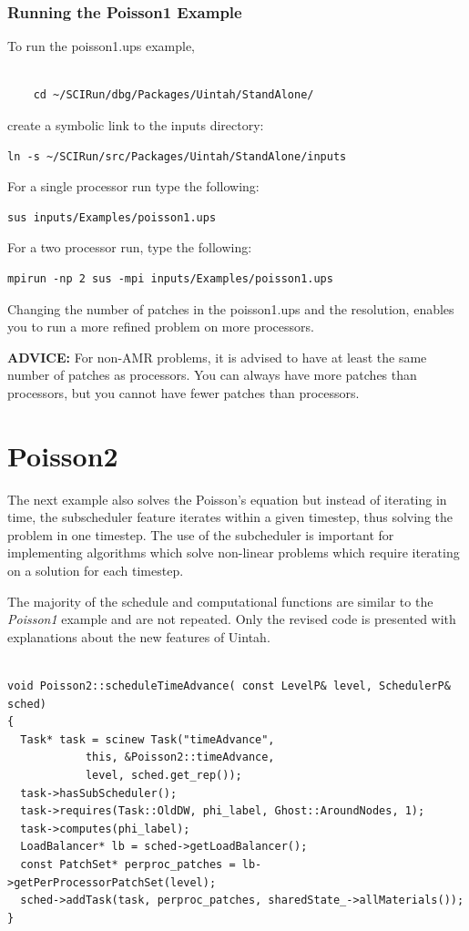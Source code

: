 \documentclass[12pt]{report}
\begin{document}
\subsubsection{Running the Poisson1 Example}

To run the poisson1.ups example, 
\begin{Verbatim}[fontsize=\footnotesize]

	cd ~/SCIRun/dbg/Packages/Uintah/StandAlone/
\end{Verbatim}

create a symbolic link to the inputs directory:
\begin{Verbatim}[fontsize=\footnotesize]
	ln -s ~/SCIRun/src/Packages/Uintah/StandAlone/inputs
\end{Verbatim}
For a single processor run type the following:
\begin{Verbatim}[fontsize=\footnotesize]
	sus inputs/Examples/poisson1.ups
\end{Verbatim}
For a two processor run, type the following:
\begin{Verbatim}[fontsize=\footnotesize]
	mpirun -np 2 sus -mpi inputs/Examples/poisson1.ups
\end{Verbatim}
Changing the number of patches in the poisson1.ups and the resolution,
enables you to run a more refined problem on more processors.

\textbf{ADVICE:} For non-AMR problems, it is advised to have at least
the same number of patches as processors.  You can always have more
patches than processors, but you cannot have fewer patches than
processors.


\section{Poisson2}

The next example also solves the Poisson's equation but instead of
iterating in time, the subscheduler feature iterates within a given
timestep, thus solving the problem in one timestep.  The use of the
subcheduler is important for implementing algorithms which solve
non-linear problems which require iterating on a solution for each
timestep.

The majority of the schedule and computational functions are similar
to the \emph{Poisson1} example and are not repeated.  Only the revised
code is presented with explanations about the new features of Uintah.

\begin{Verbatim}[fontsize=\footnotesize]

void Poisson2::scheduleTimeAdvance( const LevelP& level, SchedulerP& sched)
{
  Task* task = scinew Task("timeAdvance",
			this, &Poisson2::timeAdvance,
			level, sched.get_rep());
  task->hasSubScheduler();
  task->requires(Task::OldDW, phi_label, Ghost::AroundNodes, 1);
  task->computes(phi_label);
  LoadBalancer* lb = sched->getLoadBalancer();
  const PatchSet* perproc_patches = lb->getPerProcessorPatchSet(level);
  sched->addTask(task, perproc_patches, sharedState_->allMaterials());
}

\end{Verbatim}
\end{document}

